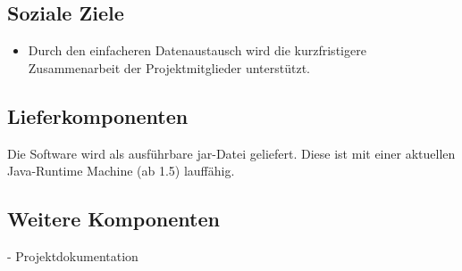 \subsection{Soziale Ziele}
\begin{itemize}
\item Durch den einfacheren Datenaustausch wird die kurzfristigere Zusammenarbeit der Projektmitglieder unterstützt.
\end{itemize}
\subsection{Lieferkomponenten}
Die Software wird als ausführbare jar-Datei geliefert. Diese ist mit einer aktuellen Java-Runtime Machine (ab 1.5) lauffähig.

\subsection{Weitere Komponenten}
 - Projektdokumentation